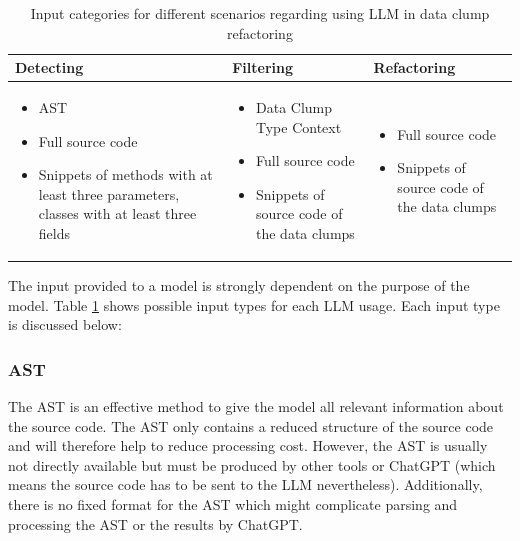 \begin{table}[]
    \centering
    \begin{tabular} {m{4cm} | m{4cm} | m{4cm}}
        Detecting & Filtering & Refactoring  \\\hline
         \begin{itemize}
             \item AST
             \item Full source code 
             \item Snippets of methods with at least three parameters, classes with at least three fields
         \end{itemize} & \begin{itemize}
             \item Data Clump Type Context
             \item Full source code
             \item Snippets of source code of the data clumps
         \end{itemize} & \begin{itemize}
             \item Full source code 
             \item Snippets of source code of the data clumps
         \end{itemize}
    \end{tabular}
    \caption{Input categories for different scenarios regarding using \ac{LLM} in data clump refactoring}
    \label{tab:data_clump_llm_input}
\end{table}

The input provided to a model is strongly dependent on the purpose of the model. Table \ref{tab:data_clump_llm_input} shows possible input types for each \ac{LLM} usage. Each input type is discussed below:

\subsubsection{AST}

The \ac{AST} is an effective method to give the model all relevant information about the source code.  The \ac{AST} only contains a reduced structure of the source code and will therefore help to reduce processing cost. However, the \ac{AST} is usually not directly available but must be produced by other tools or ChatGPT (which means the source code has to be sent to the \ac{LLM} nevertheless). Additionally, there is no fixed format for the \ac{AST} which might complicate parsing and processing the \ac{AST} or the results by ChatGPT.

